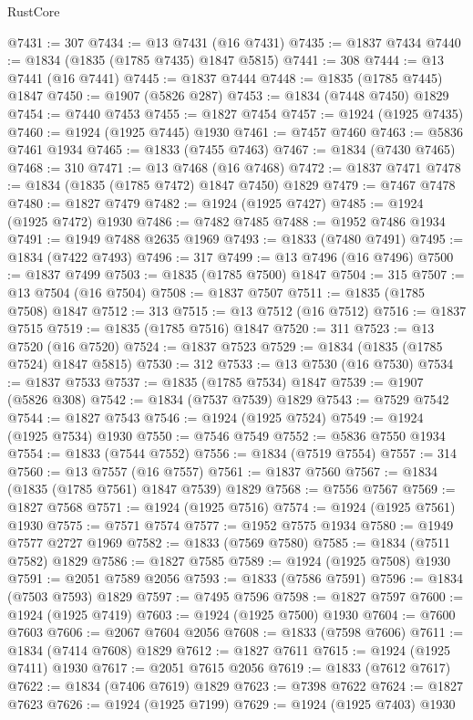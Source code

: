 \begin{lexlean}{RustCore}
\begin{coremodule}
@7431 := 307
@7434 := @13 @7431 (@16 @7431)
@7435 := @1837 @7434
@7440 := @1834 (@1835 (@1785 @7435) @1847 @5815)
@7441 := 308
@7444 := @13 @7441 (@16 @7441)
@7445 := @1837 @7444
@7448 := @1835 (@1785 @7445) @1847
@7450 := @1907 (@5826 @287)
@7453 := @1834 (@7448 @7450) @1829
@7454 := @7440 @7453
@7455 := @1827 @7454
@7457 := @1924 (@1925 @7435)
@7460 := @1924 (@1925 @7445) @1930
@7461 := @7457 @7460
@7463 := @5836 @7461 @1934
@7465 := @1833 (@7455 @7463)
@7467 := @1834 (@7430 @7465)
@7468 := 310
@7471 := @13 @7468 (@16 @7468)
@7472 := @1837 @7471
@7478 := @1834 (@1835 (@1785 @7472) @1847 @7450) @1829
@7479 := @7467 @7478
@7480 := @1827 @7479
@7482 := @1924 (@1925 @7427)
@7485 := @1924 (@1925 @7472) @1930
@7486 := @7482 @7485
@7488 := @1952 @7486 @1934
@7491 := @1949 @7488 @2635 @1969
@7493 := @1833 (@7480 @7491)
@7495 := @1834 (@7422 @7493)
@7496 := 317
@7499 := @13 @7496 (@16 @7496)
@7500 := @1837 @7499
@7503 := @1835 (@1785 @7500) @1847
@7504 := 315
@7507 := @13 @7504 (@16 @7504)
@7508 := @1837 @7507
@7511 := @1835 (@1785 @7508) @1847
@7512 := 313
@7515 := @13 @7512 (@16 @7512)
@7516 := @1837 @7515
@7519 := @1835 (@1785 @7516) @1847
@7520 := 311
@7523 := @13 @7520 (@16 @7520)
@7524 := @1837 @7523
@7529 := @1834 (@1835 (@1785 @7524) @1847 @5815)
@7530 := 312
@7533 := @13 @7530 (@16 @7530)
@7534 := @1837 @7533
@7537 := @1835 (@1785 @7534) @1847
@7539 := @1907 (@5826 @308)
@7542 := @1834 (@7537 @7539) @1829
@7543 := @7529 @7542
@7544 := @1827 @7543
@7546 := @1924 (@1925 @7524)
@7549 := @1924 (@1925 @7534) @1930
@7550 := @7546 @7549
@7552 := @5836 @7550 @1934
@7554 := @1833 (@7544 @7552)
@7556 := @1834 (@7519 @7554)
@7557 := 314
@7560 := @13 @7557 (@16 @7557)
@7561 := @1837 @7560
@7567 := @1834 (@1835 (@1785 @7561) @1847 @7539) @1829
@7568 := @7556 @7567
@7569 := @1827 @7568
@7571 := @1924 (@1925 @7516)
@7574 := @1924 (@1925 @7561) @1930
@7575 := @7571 @7574
@7577 := @1952 @7575 @1934
@7580 := @1949 @7577 @2727 @1969
@7582 := @1833 (@7569 @7580)
@7585 := @1834 (@7511 @7582) @1829
@7586 := @1827 @7585
@7589 := @1924 (@1925 @7508) @1930
@7591 := @2051 @7589 @2056
@7593 := @1833 (@7586 @7591)
@7596 := @1834 (@7503 @7593) @1829
@7597 := @7495 @7596
@7598 := @1827 @7597
@7600 := @1924 (@1925 @7419)
@7603 := @1924 (@1925 @7500) @1930
@7604 := @7600 @7603
@7606 := @2067 @7604 @2056
@7608 := @1833 (@7598 @7606)
@7611 := @1834 (@7414 @7608) @1829
@7612 := @1827 @7611
@7615 := @1924 (@1925 @7411) @1930
@7617 := @2051 @7615 @2056
@7619 := @1833 (@7612 @7617)
@7622 := @1834 (@7406 @7619) @1829
@7623 := @7398 @7622
@7624 := @1827 @7623
@7626 := @1924 (@1925 @7199)
@7629 := @1924 (@1925 @7403) @1930

\end{coremodule}
\end{lexlean}
